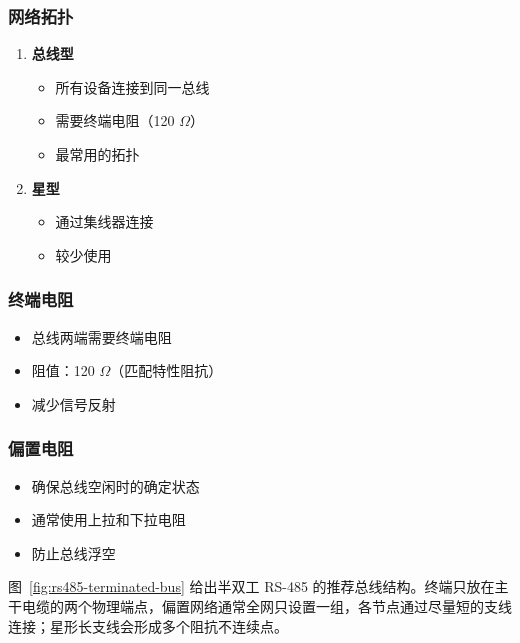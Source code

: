 \subsubsection{网络拓扑}

\begin{enumerate}
  \item \textbf{总线型}
    \begin{itemize}
      \item 所有设备连接到同一总线
      \item 需要终端电阻（120 $\Omega$）
      \item 最常用的拓扑
    \end{itemize}

  \item \textbf{星型}
    \begin{itemize}
      \item 通过集线器连接
      \item 较少使用
    \end{itemize}
\end{enumerate}

\subsubsection{终端电阻}

\begin{itemize}
  \item 总线两端需要终端电阻
  \item 阻值：120 $\Omega$（匹配特性阻抗）
  \item 减少信号反射
\end{itemize}

\subsubsection{偏置电阻}

\begin{itemize}
  \item 确保总线空闲时的确定状态
  \item 通常使用上拉和下拉电阻
  \item 防止总线浮空
\end{itemize}

图~\ref{fig:rs485-terminated-bus} 给出半双工 RS-485 的推荐总线结构。终端只放在主干电缆的两个物理端点，偏置网络通常全网只设置一组，各节点通过尽量短的支线连接；星形长支线会形成多个阻抗不连续点。


